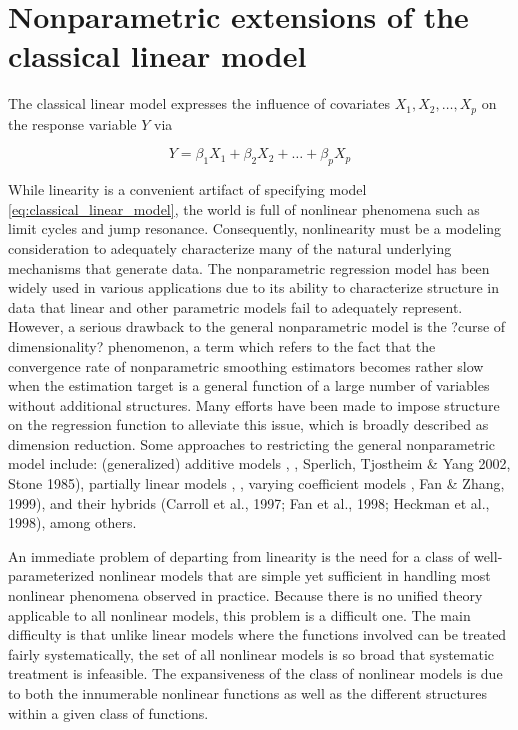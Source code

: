 \documentclass[12pt]{article}
\begin{document}
\nocite{*}

\section{Nonparametric extensions of the classical linear model}

The classical linear model expresses the influence of covariates $X_1, X_2, \dots, X_p$ on the response variable $Y$ via 

\begin{equation} \label{eq:classical_linear_model}
Y = \beta_1 X_1 + \beta_2 X_2 + \dots + \beta_p X_p 
\end{equation}

While linearity is a convenient artifact of specifying model \ref{eq:classical_linear_model}, the world is full of nonlinear phenomena such as limit cycles and jump resonance. Consequently, nonlinearity must be a modeling consideration to adequately characterize many of the natural underlying mechanisms that generate data. The nonparametric regression model has been widely used in various applications due to its ability to characterize structure in data that linear and other parametric models fail to adequately represent. However, a serious drawback to the general nonparametric model is the ?curse of dimensionality? phenomenon, a term which refers to the fact that the convergence rate of nonparametric smoothing estimators becomes rather slow when the estimation target is a general function of a large number of variables without additional structures. Many efforts have been made to impose structure on the regression function to alleviate this issue, which is broadly described as dimension reduction. Some approaches to restricting the general nonparametric model include: (generalized) additive models \cite{chen1993nonlinear}\cite{hastie1990generalized}, \cite{hastie1986generalized}, Sperlich, Tjostheim \& Yang 2002, Stone 1985), partially linear models \cite{hardle2007partially}, \cite{zeger1994semiparametric}, varying coefficient models \cite{hastie1993varying}, Fan \& Zhang, 1999), and their hybrids  (Carroll et al., 1997; Fan et al., 1998; Heckman et al., 1998), among others.

An immediate problem of departing from linearity is the need for a class of well-parameterized nonlinear models that are simple yet sufficient in handling most nonlinear phenomena observed in practice. Because there is no unified theory applicable to all nonlinear models, this problem is a difficult one. The main difficulty is that unlike linear models where the functions involved can be treated fairly systematically, the set of all nonlinear models is so broad that systematic treatment is infeasible. The expansiveness of the class of nonlinear models is due to both the innumerable nonlinear functions as well as the different structures within a given class of functions. 
 
\end{document}
